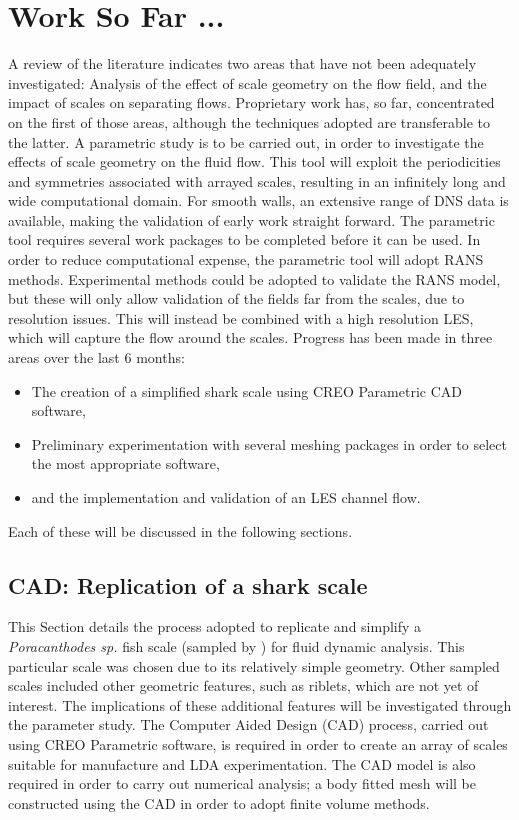 \documentclass[12pt,oneside,a4paper]{article}
\begin{document}
\newpage

\section{Work So Far ...}
A review of the literature indicates two areas that have not been adequately investigated: Analysis of the effect of scale geometry on the flow field, and the impact of scales on separating flows. Proprietary work has, so far, concentrated on the first of those areas, although the techniques adopted are transferable to the latter. A parametric study is to be carried out, in order to investigate the effects of scale geometry on the fluid flow. This tool will exploit the periodicities and symmetries associated with arrayed scales, resulting in an infinitely long and wide computational domain. For smooth walls, an extensive range of DNS data is available, making the validation of early work straight forward. The parametric tool requires several work packages to be completed before it can be used. In order to reduce computational expense, the parametric tool will adopt RANS methods. Experimental methods could be adopted to validate the RANS model, but these will only allow validation of the fields far from the scales, due to resolution issues. This will instead be combined with a high resolution LES, which will capture the flow around the scales. Progress has been made in three areas over the last 6 months:

\begin{itemize}
\itemsep0em
\item The creation of a simplified shark scale using CREO Parametric CAD software,

\item Preliminary experimentation with several meshing packages in order to select the most appropriate software,

\item and the implementation and validation of an LES channel flow.
\end{itemize}

Each of these will be discussed in the following sections.

\subsection{CAD: Replication of a shark scale}
\label{section:cad}
This Section details the process adopted to replicate and simplify a \textit{Poracanthodes sp.} fish scale (sampled by \cite{fletcher2014phd}) for fluid dynamic analysis. This particular scale was chosen due to its relatively simple geometry. Other sampled scales included other geometric features, such as riblets, which are not yet of interest. The implications of these additional features will be investigated through the parameter study. The Computer Aided Design (CAD) process, carried out using CREO Parametric software, is required in order to create an array of scales suitable for manufacture and LDA experimentation. The CAD model is also required in order to carry out numerical analysis; a body fitted mesh will be constructed using the CAD in order to adopt finite volume methods.
\end{document}
